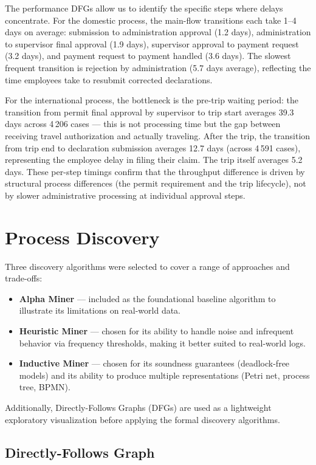 \documentclass[11pt,a4paper]{article}
\begin{document}
The performance DFGs allow us to identify the specific steps where delays concentrate. For the domestic process, the main-flow transitions each take 1--4 days on average: submission to administration approval (1.2 days), administration to supervisor final approval (1.9 days), supervisor approval to payment request (3.2 days), and payment request to payment handled (3.6 days). The slowest frequent transition is rejection by administration (5.7 days average), reflecting the time employees take to resubmit corrected declarations.

For the international process, the bottleneck is the pre-trip waiting period: the transition from permit final approval by supervisor to trip start averages 39.3 days across 4\,206 cases --- this is not processing time but the gap between receiving travel authorization and actually traveling. After the trip, the transition from trip end to declaration submission averages 12.7 days (across 4\,591 cases), representing the employee delay in filing their claim. The trip itself averages 5.2 days. These per-step timings confirm that the throughput difference is driven by structural process differences (the permit requirement and the trip lifecycle), not by slower administrative processing at individual approval steps.

\section{Process Discovery}

Three discovery algorithms were selected to cover a range of approaches and trade-offs:
\begin{itemize}[leftmargin=*]
    \item \textbf{Alpha Miner} — included as the foundational baseline algorithm to illustrate its limitations on real-world data.
    \item \textbf{Heuristic Miner} — chosen for its ability to handle noise and infrequent behavior via frequency thresholds, making it better suited to real-world logs.
    \item \textbf{Inductive Miner} — chosen for its soundness guarantees (deadlock-free models) and its ability to produce multiple representations (Petri net, process tree, BPMN).
\end{itemize}
Additionally, Directly-Follows Graphs (DFGs) are used as a lightweight exploratory visualization before applying the formal discovery algorithms.

\subsection{Directly-Follows Graph}
\end{document}
